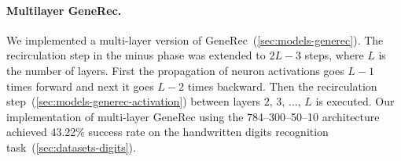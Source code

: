 \paragraph{Multilayer GeneRec.}
\label{sec:sim-our-generec-multi} 

We implemented a multi-layer version of GeneRec~(\ref{sec:models-generec}). The recirculation step in the minus phase was extended to $2L-3$ steps, where $L$ is the number of layers. First the propagation of neuron activations goes $L-1$ times forward and next it goes $L-2$ times backward. Then the recirculation step~(\ref{sec:models-generec-activation}) between layers $2,\,3,\,\ldots,\,L$ is executed. Our implementation of multi-layer GeneRec using the 784--300--50--10 architecture achieved 43.22\% success rate on the handwritten digits recognition task~(\ref{sec:datasets-digits}). 
